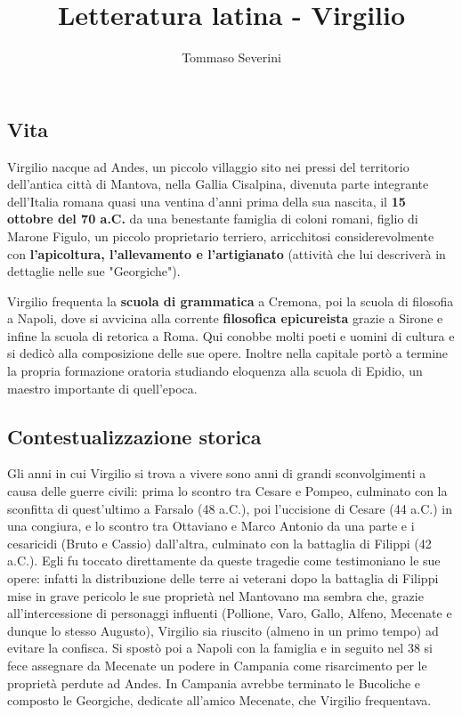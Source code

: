 \documentclass[10pt,a4paper]{article}
\author{Tommaso Severini}
\title{Letteratura latina - Virgilio}
\begin{document}
	\maketitle
	
	\subsection*{Vita}
	
	Virgilio nacque ad Andes, un piccolo villaggio sito nei pressi del territorio dell'antica città di Mantova, nella Gallia Cisalpina, divenuta parte integrante dell'Italia romana quasi una ventina d'anni prima della sua nascita, il \textbf{15 ottobre del 70 a.C.} da una benestante famiglia di coloni romani, figlio di Marone Figulo, un piccolo proprietario terriero, arricchitosi considerevolmente con \textbf{l'apicoltura, l'allevamento e l'artigianato} (attività che lui descriverà in dettaglie nelle sue "Georgiche").
	
	Virgilio frequenta la \textbf{scuola di grammatica} a Cremona, poi la scuola di filosofia a Napoli, dove si avvicina alla corrente \textbf{filosofica epicureista} grazie a Sirone e infine la scuola di retorica a Roma. Qui conobbe molti poeti e uomini di cultura e si dedicò alla composizione delle sue opere. Inoltre nella capitale portò a termine la propria formazione oratoria studiando eloquenza alla scuola di Epidio, un maestro importante di quell'epoca.
	
	\subsection*{Contestualizzazione storica}
	
	Gli anni in cui Virgilio si trova a vivere sono anni di grandi sconvolgimenti a causa delle guerre civili: prima lo scontro tra Cesare e Pompeo, culminato con la sconfitta di quest'ultimo a Farsalo (48 a.C.), poi l'uccisione di Cesare (44 a.C.) in una congiura, e lo scontro tra Ottaviano e Marco Antonio da una parte e i cesaricidi (Bruto e Cassio) dall'altra, culminato con la battaglia di Filippi (42 a.C.). Egli fu toccato direttamente da queste tragedie come testimoniano le sue opere: infatti la distribuzione delle terre ai veterani dopo la battaglia di Filippi mise in grave pericolo le sue proprietà nel Mantovano ma sembra che, grazie all'intercessione di personaggi influenti (Pollione, Varo, Gallo, Alfeno, Mecenate e dunque lo stesso Augusto), Virgilio sia riuscito (almeno in un primo tempo) ad evitare la confisca. Si spostò poi a Napoli con la famiglia e in seguito nel 38 si fece assegnare da Mecenate un podere in Campania come risarcimento per le proprietà perdute ad Andes. In Campania avrebbe terminato le Bucoliche e composto le Georgiche, dedicate all'amico Mecenate, che Virgilio frequentava.
	
\end{document}
